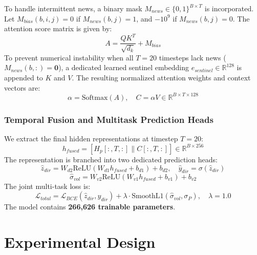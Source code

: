 \documentclass[10pt,journal,compsoc,twocolumn]{IEEEtran}
\begin{document}
To handle intermittent news, a binary mask $M_{news} \in \{0, 1\}^{B \times T}$ is incorporated. Let $M_{bias}(b, i, j) = 0$ if $M_{news}(b, j) = 1$, and $-10^9$ if $M_{news}(b, j) = 0$. The attention score matrix is given by:
\begin{equation}
A = \frac{Q K^T}{\sqrt{d_k}} + M_{bias}
\end{equation}
To prevent numerical instability when all $T=20$ timesteps lack news ($M_{news}(b, :) = \mathbf{0}$), a dedicated learned sentinel embedding $e_{sentinel} \in \mathbb{R}^{128}$ is appended to $K$ and $V$. The resulting normalized attention weights and context vectors are:
\begin{equation}
\alpha = \text{Softmax}(A), \quad C = \alpha V \in \mathbb{R}^{B \times T \times 128}
\end{equation}

\subsubsection{Temporal Fusion and Multitask Prediction Heads}
We extract the final hidden representations at timestep $T=20$:
\begin{equation}
h_{fused} = [ H_p[:, T, :] \parallel C[:, T, :] ] \in \mathbb{R}^{B \times 256}
\end{equation}
The representation is branched into two dedicated prediction heads:
\begin{equation}
\hat{z}_{dir} = W_{d2} \text{ReLU}(W_{d1} h_{fused} + b_{d1}) + b_{d2}, \quad \hat{y}_{dir} = \sigma(\hat{z}_{dir})
\end{equation}
\begin{equation}
\hat{\sigma}_{vol} = W_{v2} \text{ReLU}(W_{v1} h_{fused} + b_{v1}) + b_{v2}
\end{equation}
The joint multi-task loss is:
\begin{equation}
\mathcal{L}_{total} = \mathcal{L}_{BCE}(\hat{z}_{dir}, y_{dir}) + \lambda \cdot \text{SmoothL1}(\hat{\sigma}_{vol}, \sigma_P), \quad \lambda = 1.0
\end{equation}
The model contains \textbf{266,626 trainable parameters}.

\section{Experimental Design}
\end{document}
